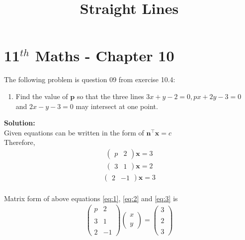 \documentclass[12pt]{article}
\newcommand{\solution}{\noindent \textbf{Solution: }}
\newcommand{\myvec}[1]{\ensuremath{\begin{pmatrix}#1\end{pmatrix}}}
\let\vec\mathbf
\begin{document}
\graphicspath{{./Documents}{./figs}}
\begin{center}
	\title{\textbf{Straight Lines}}
	\date{\vspace{-5ex}}
	\maketitle
\end{center}
\setcounter{page}{1}
\section*{11$ ^{th} $ Maths - Chapter 10}
The following problem is question 09 from exercise 10.4:
\begin{enumerate}
	\item Find the value of $\vec{p}$ so that the three lines $ 3x + y - 2 = 0, px + 2y - 3 = 0 $ and $ 2x - y - 3 = 0 $ may intersect at one point.
\end{enumerate}
\solution \\
Given equations can be written in the form of $ \vec{n}^{\top}\vec{x} = c$ \\
Therefore, \\ 
\begin{align}
	\myvec{p&2}\vec{x}=3
	\label{eq:1}
\end{align}
\begin{align}
	\myvec{3&1}\vec{x}=2
	\label{eq:2}
\end{align}
\begin{align}
	\myvec{2&-1}\vec{x}=3
	\label{eq:3}
\end{align}\\
Matrix form of above equations \eqref{eq:1}, \eqref{eq:2} and \eqref{eq:3} is
\begin{align}
	\begin{pmatrix}
		p & 2 \\ \\ 3 & 1 \\ \\ 2 & -1
	\end{pmatrix}
	\begin{pmatrix}
		x \\ \\ y
	\end{pmatrix}
	=
	\begin{pmatrix}
		3 \\ \\ 2 \\ \\ 3
	\end{pmatrix}
\end{align}
\end{document}
